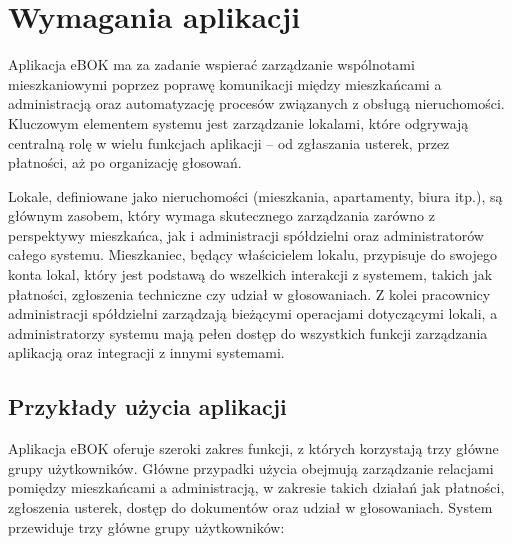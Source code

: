 \section{Wymagania aplikacji} %

Aplikacja eBOK ma za zadanie wspierać zarządzanie wspólnotami mieszkaniowymi poprzez poprawę komunikacji między mieszkańcami a administracją oraz automatyzację procesów związanych z obsługą nieruchomości. Kluczowym elementem systemu jest zarządzanie lokalami, które odgrywają centralną rolę w wielu funkcjach aplikacji – od zgłaszania usterek, przez płatności, aż po organizację głosowań.

Lokale, definiowane jako nieruchomości (mieszkania, apartamenty, biura itp.), są głównym zasobem, który wymaga skutecznego zarządzania zarówno z perspektywy mieszkańca, jak i administracji spółdzielni oraz administratorów całego systemu. Mieszkaniec, będący właścicielem lokalu, przypisuje do swojego konta lokal, który jest podstawą do wszelkich interakcji z systemem, takich jak płatności, zgłoszenia techniczne czy udział w głosowaniach. Z kolei pracownicy administracji spółdzielni zarządzają bieżącymi operacjami dotyczącymi lokali, a administratorzy systemu mają pełen dostęp do wszystkich funkcji zarządzania aplikacją oraz integracji z innymi systemami.

\subsection{Przykłady użycia aplikacji}

Aplikacja eBOK oferuje szeroki zakres funkcji, z których korzystają trzy główne grupy użytkowników. Główne przypadki użycia obejmują zarządzanie relacjami pomiędzy mieszkańcami a administracją, w zakresie takich działań jak płatności, zgłoszenia usterek, dostęp do dokumentów oraz udział w głosowaniach. System przewiduje trzy główne grupy użytkowników:

